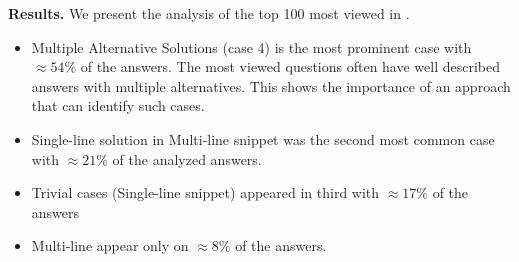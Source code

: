 \textbf{Results. }
We present the analysis of the top 100 most viewed in . 
\begin{itemize}
	\item Multiple Alternative Solutions (case 4) is the most prominent case with $\approx{54\%}$ of the answers. The most viewed questions often have well described answers with multiple alternatives. This shows the importance of an approach that can identify such cases.
    \item Single-line solution in Multi-line snippet was the second most common case with $\approx{21\%}$ of the analyzed answers.
    \item Trivial cases (Single-line snippet) appeared in third with $\approx{17\%}$ of the answers
    \item Multi-line appear only on $\approx{8\%}$ of the answers. 
\end{itemize}











